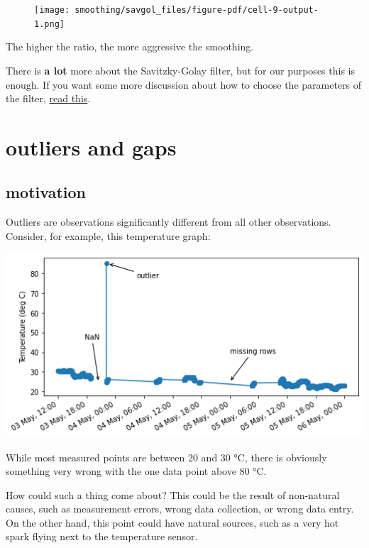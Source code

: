 \documentclass[
  letterpaper,
  DIV=11,
  numbers=noendperiod,
  oneside]{scrreprt}
\begin{document}
\begin{figure}[H]

{\centering \texttt{[image: smoothing/savgol\_files/figure-pdf/cell-9-output-1.png]}

}

\end{figure}

The higher the ratio, the more aggressive the smoothing.

There is \textbf{a lot} more about the Savitzky-Golay filter, but for
our purposes this is enough. If you want some more discussion about how
to choose the parameters of the filter,
\href{https://nirpyresearch.com/savitzky-golay-smoothing-method/}{read
this}.

\part{outliers and gaps}

\hypertarget{motivation-2}{%
\chapter{motivation}\label{motivation-2}}

Outliers are observations significantly different from all other
observations. Consider, for example, this temperature graph:

\includegraphics{outliers/temp-outlier.png}

While most measured points are between 20 and 30 °C, there is obviously
something very wrong with the one data point above 80 °C.

How could such a thing come about? This could be the result of
non-natural causes, such as measurement errors, wrong data collection,
or wrong data entry. On the other hand, this point could have natural
sources, such as a very hot spark flying next to the temperature sensor.
\end{document}

